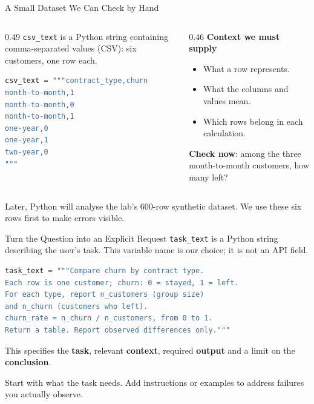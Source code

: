 \documentclass[aspectratio=169]{beamer}
\begin{document}
\begin{frame}[fragile]{A Small Dataset We Can Check by Hand}
  \begin{columns}[T,onlytextwidth]
    \begin{column}{0.49\linewidth}
      \small \texttt{csv\_text} is a Python string containing comma-separated values (CSV): six customers, one row each.
\begin{lstlisting}[language=Python,commentstyle=\ttfamily\color{AMU_dk1}]
csv_text = """contract_type,churn
month-to-month,1
month-to-month,0
month-to-month,1
one-year,0
one-year,1
two-year,0
"""
\end{lstlisting}
    \end{column}
    \begin{column}{0.46\linewidth}
      \small \textbf{Context we must supply}
      \begin{itemize}
        \item What a row represents.
        \item What the columns and values mean.
        \item Which rows belong in each calculation.
      \end{itemize}
      \textbf{Check now}: among the three month-to-month customers, how many left?
    \end{column}
  \end{columns}
  \par\vspace{0.3em}
  \small Later, Python will analyse the lab's 600-row synthetic dataset. We use these six rows first to make errors visible.
\end{frame}

\begin{frame}[fragile]{Turn the Question into an Explicit Request}
  \small \texttt{task\_text} is a Python string describing the user's task. This variable name is our choice; it is not an API field.
\begin{lstlisting}[language=Python,commentstyle=\ttfamily\color{AMU_dk1}]
task_text = """Compare churn by contract type.
Each row is one customer; churn: 0 = stayed, 1 = left.
For each type, report n_customers (group size)
and n_churn (customers who left).
churn_rate = n_churn / n_customers, from 0 to 1.
Return a table. Report observed differences only."""
\end{lstlisting}
  \small This specifies the \textbf{task}, relevant \textbf{context}, required \textbf{output} and a limit on the \textbf{conclusion}.
  \par\vspace{0.4em}
  Start with what the task needs. Add instructions or examples to address failures you actually observe.
\end{frame}
\end{document}
